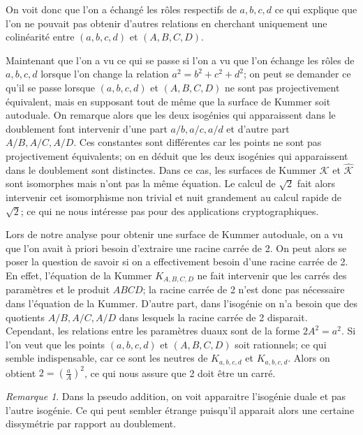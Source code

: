 \documentclass[a4paper]{article}
\theoremstyle{definition}
\theoremstyle{remark}
\newtheorem{remarque}{Remarque}
\numberwithin{equation}{section}
\begin{document}
On voit donc que l'on a échangé les rôles respectifs de $a,b,c,d$ ce qui explique que l'on ne pouvait pas obtenir d'autres relations en cherchant uniquement une colinéarité entre $(a,b,c,d)$ et $(A,B,C,D)$.

Maintenant que l'on a vu ce qui se passe si l'on a vu que l'on échange les rôles de $a,b,c,d$ lorsque l'on change la relation $a^2 = b^2 + c^2 + d^2$; on peut se demander ce qu'il se passe lorsque $(a,b,c,d)$ et $(A,B,C,D)$ ne sont pas projectivement équivalent, mais en supposant tout de même que la surface de Kummer soit autoduale. On remarque alors que les deux isogénies qui apparaissent dans le doublement font intervenir d'une part $a/b,a/c,a/d$ et d'autre part $A/B,A/C,A/D$. Ces constantes sont différentes car les points ne sont pas projectivement équivalents; on en déduit que les deux isogénies qui apparaissent dans le doublement sont distinctes.
Dans ce cas, les surfaces de Kummer $\mathcal{K}$ et $\hat{\mathcal{K}}$ sont isomorphes mais n'ont pas la même équation. Le calcul de $\sqrt{2}$ fait alors intervenir cet isomorphisme non trivial et nuit grandement au calcul rapide de $\sqrt{2}$; ce qui ne nous intéresse pas pour des applications cryptographiques.


Lors de notre analyse pour obtenir une surface de Kummer autoduale, on a vu que l'on avait à priori besoin d'extraire une racine carrée de 2. On peut alors se poser la question de savoir si on a effectivement besoin d'une racine carrée de 2. En effet, l'équation de la Kummer $K_{A,B,C,D}$ ne fait intervenir que les carrés des paramètres et le produit $ABCD$; la racine carrée de 2 n'est donc pas nécessaire dans l'équation de la Kummer. D'autre part, dans l'isogénie on n'a besoin que des quotients $A/B,A/C,A/D$ dans lesquels la racine carrée de 2 disparait. Cependant, les relations entre les paramètres duaux sont de la forme $2A^2 = a^2$. Si l'on veut que les points $(a,b,c,d)$ et $(A,B,C,D)$ soit rationnels; ce qui semble indispensable, car ce sont les neutres de $K_{a,b,c,d}$ et $K_{a,b,c,d}$. Alors on obtient $2 = (\frac{a}{A})^2$, ce qui nous assure que 2 doit être un carré.

\begin{remarque}
Dans la pseudo addition, on voit apparaitre l'isogénie duale et pas l'autre isogénie. Ce qui peut sembler étrange puisqu'il apparait alors une certaine dissymétrie par rapport au doublement.
\end{remarque}
\end{document}
